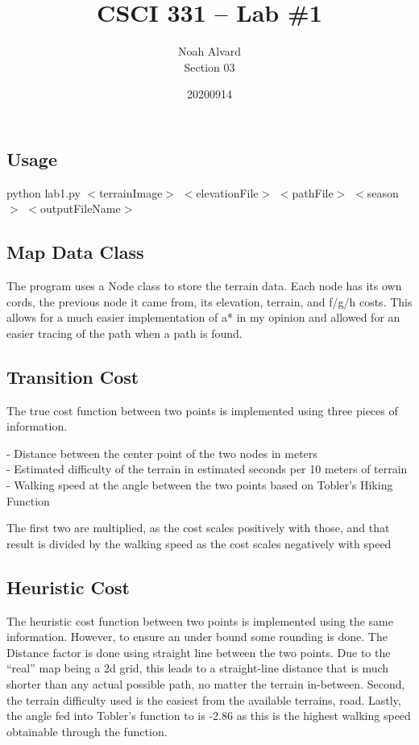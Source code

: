 \documentclass[10pt,a4paper]{article}
\title{CSCI 331 -- Lab \#1\\
}
\author{Noah Alvard\\
Section 03}
\date{20200914}
\begin{document}
\maketitle

\subsection*{Usage}
python lab1.py $<$terrainImage$>$ $<$elevationFile$>$ $<$pathFile$>$ $<$season$>$ $<$outputFileName$>$
\subsection*{Map Data Class}
The program uses a Node class to store the terrain data. Each node has its own cords, the previous node it came from, its elevation, terrain, and f/g/h costs. This allows for a much easier implementation of a* in my opinion and allowed for an easier tracing of the path when a path is found.

\subsection*{Transition Cost}
The true cost function between two points is implemented using three pieces of information.\\
\begin{addmargin}{1cm}
	- Distance between the center point of the two nodes in meters\\
	- Estimated difficulty of the terrain in estimated seconds per 10 meters of terrain\\
    - Walking speed at the angle between the two points based on Tobler’s Hiking Function\\
\end{addmargin}
The first two are multiplied, as the cost scales positively with those, and that result is divided by the walking speed as the cost scales negatively with speed\\

\subsection*{Heuristic Cost}

The heuristic cost function between two points is implemented using the same information. However, to ensure an under bound some rounding is done. The Distance factor is done using straight line between the two points. Due to the “real” map being a 2d grid, this leads to a straight-line distance that is much shorter than any actual possible path, no matter the terrain in-between. Second, the terrain difficulty used is the easiest from the available terrains, road. Lastly, the angle fed into Tobler’s function to is -2.86 as this is the highest walking speed obtainable through the function.
\end{document}
